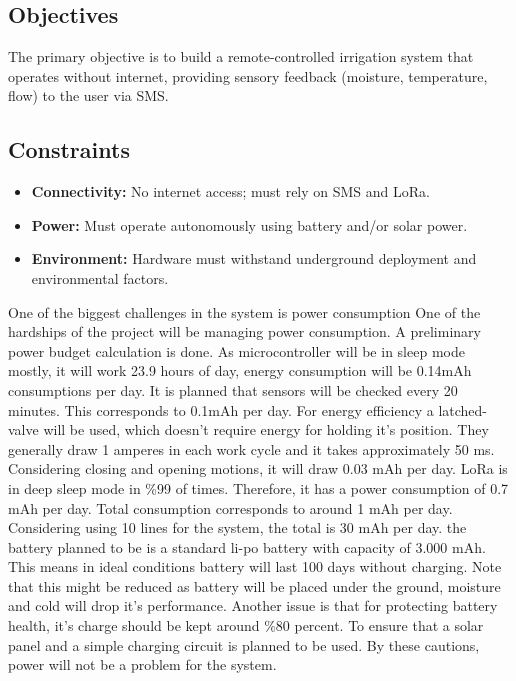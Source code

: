 \documentclass[conference]{IEEEtran}
\begin{document}
\subsection{Objectives}
The primary objective is to build a remote-controlled irrigation system that operates without internet, providing sensory feedback (moisture, temperature, flow) to the user via SMS.

\subsection{Constraints}
\begin{itemize}
    \item \textbf{Connectivity:} No internet access; must rely on SMS and LoRa.
    \item \textbf{Power:} Must operate autonomously using battery and/or solar power.
    \item \textbf{Environment:} Hardware must withstand underground deployment and environmental factors.
\end{itemize}
One of the biggest challenges in the system is power consumption One of the hardships of the project will be managing power consumption. A
preliminary power budget calculation is done. As microcontroller will be in sleep
mode mostly, it will work 23.9 hours of day, energy consumption will be 0.14mAh
consumptions per day. It is planned that sensors will be checked every 20 minutes.
This corresponds to 0.1mAh per day. For energy efficiency a latched-valve will be
used, which doesn’t require energy for holding it’s position. They generally draw
1 amperes in each work cycle and it takes approximately 50 ms. Considering
closing and opening motions, it will draw 0.03 mAh per day. LoRa is in deep
sleep mode in \%99 of times. Therefore, it has a power consumption of 0.7 mAh
per day. Total consumption corresponds to around 1 mAh per day. Considering
using 10 lines for the system, the total is 30 mAh per day. the battery planned
to be is a standard li-po battery with capacity of 3.000 mAh. This means in ideal
conditions battery will last 100 days without charging. Note that this might be
reduced as battery will be placed under the ground, moisture and cold will drop
it’s performance. Another issue is that for protecting battery health, it’s charge
should be kept around \%80 percent. To ensure that a solar panel and a simple
charging circuit is planned to be used. By these cautions, power will not be a
problem for the system.
\end{document}
